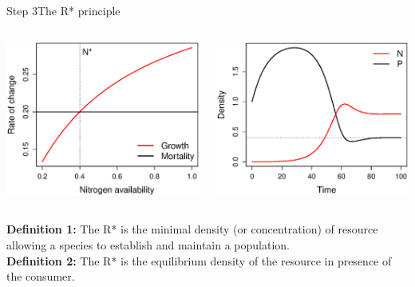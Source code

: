 \documentclass{eecslides}
\begin{document}

	\begin{frame}{Step 3}{The R* principle}

		\begin{columns}
			\begin{column}{0.5\textwidth}			
				\begin{center}
					\includegraphics[height=0.5\textheight]{Rstar.eps}
				\end{center}
			\end{column}
			\begin{column}{0.5\textwidth}
				\begin{center}
					\includegraphics[height=0.5\textheight]{Rstar_dynamics.eps}
				\end{center}
			\end{column}
		\end{columns}
	 
	\textbf{Definition 1:} The R* is the minimal density (or concentration) of resource allowing a species to establish and maintain a population.\\
	\textbf{Definition 2:} The R* is the equilibrium density of the resource in presence of the consumer.
	\end{frame}
\end{document}
